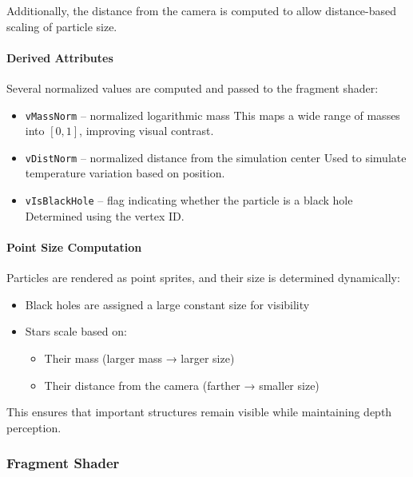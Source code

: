 \documentclass[12pt]{article}
\begin{document}
Additionally, the distance from the camera is computed to allow distance-based scaling of particle size.

\paragraph{Derived Attributes}

Several normalized values are computed and passed to the fragment shader:

\begin{itemize}
\item \texttt{vMassNorm} – normalized logarithmic mass
This maps a wide range of masses into $[0,1]$, improving visual contrast.

\item \texttt{vDistNorm} – normalized distance from the simulation center  
Used to simulate temperature variation based on position.

\item \texttt{vIsBlackHole} – flag indicating whether the particle is a black hole  
Determined using the vertex ID.


\end{itemize}

\paragraph{Point Size Computation}

Particles are rendered as point sprites, and their size is determined dynamically:

\begin{itemize}
\item Black holes are assigned a large constant size for visibility
\item Stars scale based on:
\begin{itemize}
\item Their mass (larger mass → larger size)
\item Their distance from the camera (farther → smaller size)
\end{itemize}
\end{itemize}

This ensures that important structures remain visible while maintaining depth perception.

\subsubsection{Fragment Shader}
\end{document}
